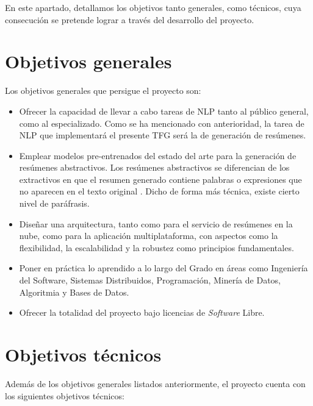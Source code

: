 
En este apartado, detallamos los objetivos tanto generales, como técnicos, cuya consecución se pretende lograr a través del desarrollo del proyecto.

\section{Objetivos generales}

Los objetivos generales que persigue el proyecto son:

\begin{itemize} [\textbullet]
	\item Ofrecer la capacidad de llevar a cabo tareas de NLP tanto al público general, como al especializado. Como se ha mencionado con anterioridad, la tarea de NLP que implementará el presente TFG será la de generación de resúmenes.
	
	\item Emplear modelos pre-entrenados del estado del arte para la generación de resúmenes abstractivos. Los resúmenes abstractivos se diferencian de los extractivos en que el resumen generado contiene palabras o expresiones que no aparecen en el texto original \cite{abigail17}. Dicho de forma más técnica, existe cierto nivel de paráfrasis.
	
	\item Diseñar una arquitectura, tanto como para el servicio de resúmenes en la nube, como para la aplicación multiplataforma, con aspectos como la flexibilidad, la escalabilidad y la robustez como principios fundamentales.
	
	\item Poner en práctica lo aprendido a lo largo del Grado en áreas como Ingeniería del Software, Sistemas Distribuidos, Programación, Minería de Datos, Algoritmia y Bases de Datos.
	
	\item Ofrecer la totalidad del proyecto bajo licencias de \emph{Software} Libre.
\end{itemize}

\bigskip

\section{Objetivos técnicos}

Además de los objetivos generales listados anteriormente, el proyecto cuenta con los siguientes objetivos técnicos:

